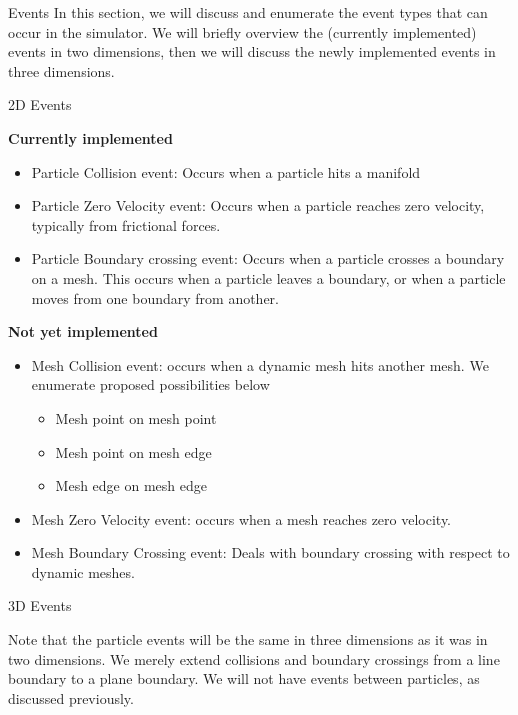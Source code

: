\documentclass[11pt]{article}
\begin{document}
\begin{section}{Events}
In this section, we will discuss and enumerate the event types that can occur in the simulator. We will briefly overview the (currently implemented) events in two dimensions, then we will discuss the newly implemented events in three dimensions.

\begin{subsection}{2D Events}

\textbf{Currently implemented}\\
\begin{itemize}
\item Particle Collision event: Occurs when a particle hits a manifold
\item Particle Zero Velocity event: Occurs when a particle reaches zero velocity, typically from frictional forces. 
\item Particle Boundary crossing event: Occurs when a particle crosses a boundary on a mesh. This occurs when a particle leaves a boundary, or when a particle moves from one boundary from another.
\end{itemize}

\textbf{Not yet implemented}\\
\begin{itemize}
\item Mesh Collision event: occurs when a dynamic mesh hits another mesh. We enumerate proposed possibilities below
\begin{itemize}
\item Mesh point on mesh point
\item Mesh point on mesh edge
\item Mesh edge on mesh edge
\end{itemize}
\item Mesh Zero Velocity event: occurs when a mesh reaches zero velocity.
\item Mesh Boundary Crossing event: Deals with boundary crossing with respect to dynamic meshes. 
\end{itemize}

\end{subsection}
\begin{subsection}{3D Events}

Note that the particle events will be the same in three dimensions as it was in two dimensions. We merely extend collisions and boundary crossings from a line boundary to a plane boundary. We will not have events between particles, as discussed previously. \\


\end{subsection}
\end{section}
\end{document}
